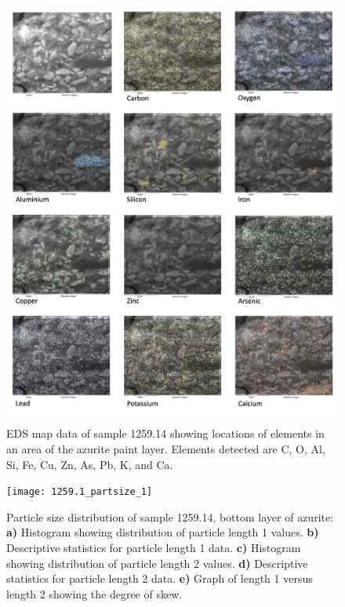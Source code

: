 \begin{figure}[H]
\centering
\begin{minipage}[t]{\linewidth}
  \centering
  \includegraphics[width=0.9\linewidth]{1259.14_mapdata_1}
\hfill
\includegraphics[width=0.9\linewidth]{1259.14_mapdata_2}
\hfill
\end{minipage}
\caption[EDS map data, sample 1259.14.]{EDS map data of sample 1259.14 showing locations of elements in an area of the azurite paint layer. Elements detected are C, O, Al, Si, Fe, Cu, Zn, As, Pb, K, and Ca.}
\label{fig:1259.14_mapdata}
\end{figure}

\begin{figure}[H]
\centering
  \texttt{[image: 1259.1\_partsize\_1]}
\caption[Particle size distribution, sample 1259.14 bottom layer.]{Particle size distribution of sample 1259.14, bottom layer of azurite: \textbf{a)} Histogram showing distribution of particle length 1 values. \textbf{b)} Descriptive statistics for particle length 1 data. \textbf{c)} Histogram showing distribution of particle length 2 values. \textbf{d)} Descriptive statistics for particle length 2 data. \textbf{e)} Graph of length 1 versus length 2 showing the degree of skew.}
\label{fig:1259.1_partsize_1}
\end{figure}


